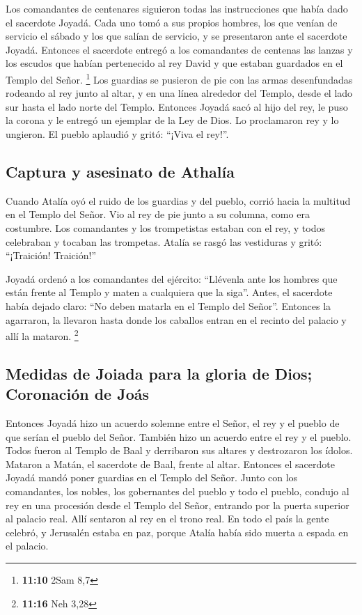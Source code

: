  Los comandantes de centenares siguieron todas las
instrucciones que había dado el sacerdote Joyadá. Cada uno tomó a sus
propios hombres, los que venían de servicio el sábado y los que salían
de servicio, y se presentaron ante el sacerdote Joyadá. 
Entonces el sacerdote entregó a los comandantes de centenas las lanzas y
los escudos que habían pertenecido al rey David y que estaban guardados
en el Templo del Señor. \footnote{\textbf{11:10} 2Sam 8,7}
 Los guardias se pusieron de pie con las armas
desenfundadas rodeando al rey junto al altar, y en una línea alrededor
del Templo, desde el lado sur hasta el lado norte del Templo.
 Entonces Joyadá sacó al hijo del rey, le puso la corona
y le entregó un ejemplar de la Ley de Dios. Lo proclamaron rey y lo
ungieron. El pueblo aplaudió y gritó: ``¡Viva el rey!''.

\hypertarget{captura-y-asesinato-de-athaluxeda}{%
\subsection{Captura y asesinato de
Athalía}\label{captura-y-asesinato-de-athaluxeda}}

 Cuando Atalía oyó el ruido de los guardias y del pueblo,
corrió hacia la multitud en el Templo del Señor.  Vio al
rey de pie junto a su columna, como era costumbre. Los comandantes y los
trompetistas estaban con el rey, y todos celebraban y tocaban las
trompetas. Atalía se rasgó las vestiduras y gritó: ``¡Traición!
Traición!''

 Joyadá ordenó a los comandantes del ejército: ``Llévenla
ante los hombres que están frente al Templo y maten a cualquiera que la
siga''. Antes, el sacerdote había dejado claro: ``No deben matarla en el
Templo del Señor''.  Entonces la agarraron, la llevaron
hasta donde los caballos entran en el recinto del palacio y allí la
mataron. \footnote{\textbf{11:16} Neh 3,28}

\hypertarget{medidas-de-joiada-para-la-gloria-de-dios-coronaciuxf3n-de-jouxe1s}{%
\subsection{Medidas de Joiada para la gloria de Dios; Coronación de
Joás}\label{medidas-de-joiada-para-la-gloria-de-dios-coronaciuxf3n-de-jouxe1s}}

 Entonces Joyadá hizo un acuerdo solemne entre el Señor,
el rey y el pueblo de que serían el pueblo del Señor. También hizo un
acuerdo entre el rey y el pueblo.  Todos fueron al Templo
de Baal y derribaron sus altares y destrozaron los ídolos. Mataron a
Matán, el sacerdote de Baal, frente al altar. Entonces el sacerdote
Joyadá mandó poner guardias en el Templo del Señor. 
Junto con los comandantes, los nobles, los gobernantes del pueblo y todo
el pueblo, condujo al rey en una procesión desde el Templo del Señor,
entrando por la puerta superior al palacio real. Allí sentaron al rey en
el trono real.  En todo el país la gente celebró, y
Jerusalén estaba en paz, porque Atalía había sido muerta a espada en el
palacio.

